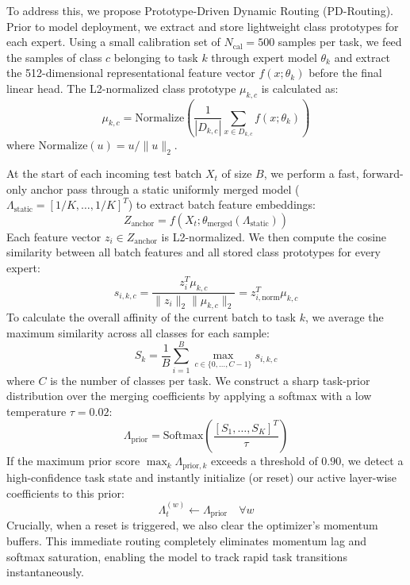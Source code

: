 \documentclass{article}
\theoremstyle{plain}
\theoremstyle{definition}
\theoremstyle{remark}
\begin{document}
To address this, we propose Prototype-Driven Dynamic Routing (PD-Routing). Prior to model deployment, we extract and store lightweight class prototypes for each expert. Using a small calibration set of $N_{\text{cal}} = 500$ samples per task, we feed the samples of class $c$ belonging to task $k$ through expert model $\theta_k$ and extract the 512-dimensional representational feature vector $f(x; \theta_k)$ before the final linear head. The L2-normalized class prototype $\mu_{k,c}$ is calculated as:
\begin{equation}
  \mu_{k,c} = \text{Normalize} \left( \frac{1}{|D_{k,c}|} \sum_{x \in D_{k,c}} f(x; \theta_k) \right)
\end{equation}
where $\text{Normalize}(u) = u / \|u\|_2$.

At the start of each incoming test batch $X_t$ of size $B$, we perform a fast, forward-only anchor pass through a static uniformly merged model ($\Lambda_{\text{static}} = [1/K, \ldots, 1/K]^T$) to extract batch feature embeddings:
\begin{equation}
  Z_{\text{anchor}} = f(X_t; \theta_{\text{merged}}(\Lambda_{\text{static}}))
\end{equation}
Each feature vector $z_i \in Z_{\text{anchor}}$ is L2-normalized. We then compute the cosine similarity between all batch features and all stored class prototypes for every expert:
\begin{equation}
  s_{i,k,c} = \frac{z_i^T \mu_{k,c}}{\|z_i\|_2 \|\mu_{k,c}\|_2} = z_{i,\text{norm}}^T \mu_{k,c}
\end{equation}
To calculate the overall affinity of the current batch to task $k$, we average the maximum similarity across all classes for each sample:
\begin{equation}
  S_k = \frac{1}{B} \sum_{i=1}^B \max_{c \in \{0, \ldots, C-1\}} s_{i,k,c}
\end{equation}
where $C$ is the number of classes per task. We construct a sharp task-prior distribution over the merging coefficients by applying a softmax with a low temperature $\tau = 0.02$:
\begin{equation}
  \Lambda_{\text{prior}} = \text{Softmax} \left( \frac{[S_1, \ldots, S_K]^T}{\tau} \right)
\end{equation}
If the maximum prior score $\max_k \Lambda_{\text{prior},k}$ exceeds a threshold of $0.90$, we detect a high-confidence task state and instantly initialize (or reset) our active layer-wise coefficients to this prior:
\begin{equation}
  \Lambda_t^{(w)} \leftarrow \Lambda_{\text{prior}} \quad \forall w
\end{equation}
Crucially, when a reset is triggered, we also clear the optimizer's momentum buffers. This immediate routing completely eliminates momentum lag and softmax saturation, enabling the model to track rapid task transitions instantaneously.
\end{document}
